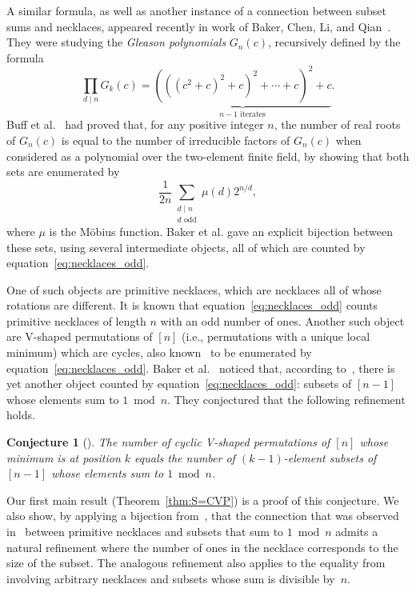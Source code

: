 \documentclass[12pt]{article}
\newtheorem{conjecture}[theorem]{Conjecture}
\theoremstyle{definition}
\begin{document}
A similar formula, as well as another instance of a connection between subset sums and necklaces, appeared recently 
in work of Baker, Chen,
Li, and Qian~\cite{Baker}. They were studying the \emph{Gleason polynomials}
$G_n(c)$, recursively defined by the formula
\begin{equation*}
    \prod_{d \mid n} G_k(c) = \underbrace{(((c^2 + c)^2 + c)^2 + \cdots + c)^2 + c}_{n - 1 \text{ iterates}}.
\end{equation*}
Buff et al.~\cite{Buff} had proved that, for any positive integer $n$, the number of real roots of $G_n(c)$ is equal to the number of irreducible factors of $G_n(c)$ when considered as a polynomial over the two-element finite field, by showing that both sets are enumerated by
\begin{equation}\label{eq:necklaces_odd}
    \frac{1}{2n} \sum_{\substack{d \mid n \\ d \text{ odd}}} \mu(d) 2^{n / d},
\end{equation}
where $\mu$ is the M\"obius function. Baker et al. gave an explicit bijection between these sets, using several intermediate objects, all of which are counted by equation~\eqref{eq:necklaces_odd}.

One of such objects are primitive necklaces, which are necklaces all of whose rotations are different. It is known that equation~\eqref{eq:necklaces_odd} counts primitive necklaces of length $n$ with an odd number of ones. Another such object are V-shaped permutations of $[n]$ (i.e., permutations with a unique local minimum) which are cycles,
also known~\cite{ArcEli} to be enumerated by equation~\eqref{eq:necklaces_odd}.
Baker et al.~\cite{Baker} noticed that, according to~\cite[A000048]{oeis}, there is yet another object counted by equation~\eqref{eq:necklaces_odd}: subsets of $[n-1]$ whose elements sum to $1\bmod n$. 
They conjectured that the following refinement holds.

\begin{conjecture}[\cite{Baker}]\label{conj:Baker} The number of cyclic V-shaped permutations of $[n]$ whose minimum is at position $k$ equals the number of $(k-1)$-element subsets of $[n-1]$ whose elements sum to $1\bmod n$.
\end{conjecture}

Our first main result (Theorem~\ref{thm:S=CVP}) is a proof of this conjecture. We also show, by applying a bijection from~\cite{ArcEli,Ste}, that the connection that was observed in~\cite{Baker} between primitive necklaces and subsets that sum to $1\bmod n$ admits a natural refinement where the number of ones in the necklace corresponds to the size of the subset. The analogous refinement also applies to the equality from \cite[Exer.~1.105]{EC1} involving arbitrary necklaces
and subsets whose sum is divisible by~$n$.
\end{document}
